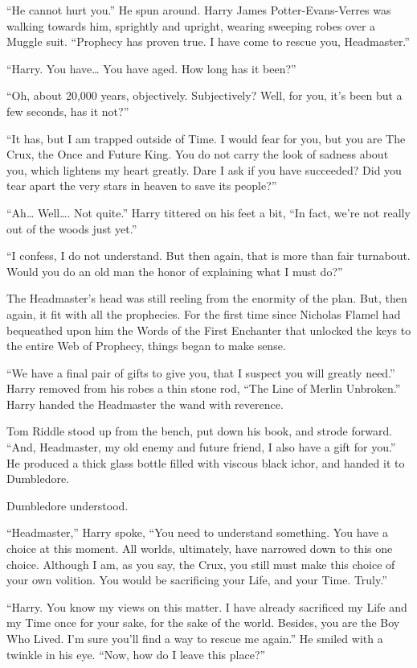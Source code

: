 “He cannot hurt you.” He spun around. Harry James Potter-Evans-Verres was walking towards him, sprightly and upright, wearing sweeping robes over a Muggle suit.  “Prophecy has proven true. I have come to rescue you, Headmaster.”

“Harry. You have… You have aged. How long has it been?”

“Oh, about 20,000 years, objectively. Subjectively? Well, for you, it’s been but a few seconds, has it not?”

“It has, but I am trapped outside of Time. I would fear for you, but you are The Crux, the Once and Future King. You do not carry the look of sadness about you, which lightens my heart greatly. Dare I ask if you have succeeded? Did you tear apart the very stars in heaven to save its people?”

“Ah… Well…. Not quite.” Harry tittered on his feet a bit, “In fact, we’re not really out of the woods just yet.”

“I confess, I do not understand. But then again, that is more than fair turnabout. Would you do an old man the honor of explaining what I must do?”
\simpleline
{}

The Headmaster’s head was still reeling from the enormity of the plan. But, then again, it fit with all the prophecies. For the first time since Nicholas Flamel had bequeathed upon him the Words of the First Enchanter that unlocked the keys to the entire Web of Prophecy, things began to make sense.

“We have a final pair of gifts to give you, that I suspect you will greatly need.” Harry removed from his robes a thin stone rod, “The Line of Merlin Unbroken.” Harry handed the Headmaster the wand with reverence.

Tom Riddle stood up from the bench, put down his book, and strode forward. “And, Headmaster, my old enemy and future friend, I also have a gift for you.” He produced a thick glass bottle filled with viscous black ichor, and handed it to Dumbledore.

Dumbledore understood.

“Headmaster,” Harry spoke, “You need to understand something. You have a choice at this moment. All worlds, ultimately, have narrowed down to this one choice. Although I am, as you say, the Crux, you still must make this choice of your own volition. You would be sacrificing your Life, and your Time. Truly.”

“Harry. You know my views on this matter. I have already sacrificed my Life and my Time once for your sake, for the sake of the world. Besides, you are the Boy Who Lived. I’m sure you’ll find a way to rescue me again.” He smiled with a twinkle in his eye. “Now, how do I leave this place?”

